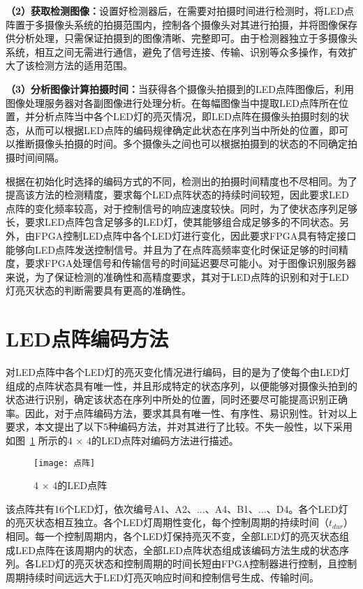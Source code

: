 \textbf{（2）获取检测图像：}设置好检测器后，在需要对拍摄时间进行检测时，将LED点阵置于多摄像头系统的拍摄范围内，控制各个摄像头对其进行拍摄，并将图像保存供分析处理，只需保证拍摄到的图像清晰、完整即可。由于检测器独立于多摄像头系统，相互之间无需进行通信，避免了信号连接、传输、识别等众多操作，有效扩大了该检测方法的适用范围。

\textbf{（3）分析图像计算拍摄时间：}当获得各个摄像头拍摄到的LED点阵图像后，利用图像处理服务器对各副图像进行处理分析。在每幅图像当中提取LED点阵所在位置，并分析点阵当中各个LED灯的亮灭情况，即LED点阵在摄像头拍摄时刻的状态，从而可以根据LED点阵的编码规律确定此状态在序列当中所处的位置，即可以推断摄像头拍摄的时间。多个摄像头之间也可以根据拍摄到的状态的不同确定拍摄时间间隔。

根据在初始化时选择的编码方式的不同，检测出的拍摄时间精度也不尽相同。为了提高该方法的检测精度，要求每个LED点阵状态的持续时间较短，因此要求LED点阵的变化频率较高，对于控制信号的响应速度较快。同时，为了使状态序列足够长，要求LED点阵包含足够多的LED灯，使其能够组合成足够多的不同状态。另外，由FPGA控制LED点阵中各个LED灯进行变化，因此要求FPGA具有特定接口能够向LED点阵发送控制信号。并且为了在点阵高频率变化时保证足够的时间精度，要求FPGA处理信号和传输信号的时间延迟要尽可能小。对于图像识别服务器来说，为了保证检测的准确性和高精度要求，其对于LED点阵的识别和对于LED灯亮灭状态的判断需要具有更高的准确性。

\section{LED点阵编码方法}
\label{codeMe}

对LED点阵中各个LED灯的亮灭变化情况进行编码，目的是为了使每个由LED灯组成的点阵状态具有唯一性，并且形成特定的状态序列，以便能够对摄像头拍到的状态进行识别，确定该状态在序列中所处的位置，同时还要尽可能提高识别正确率。因此，对于点阵编码方法，要求其具有唯一性、有序性、易识别性。针对以上要求，本文提出了以下5种编码方法，并对其进行了比较。不失一般性，以下采用如图~\ref{mat} 所示的4 × 4的LED点阵对编码方法进行描述。

\begin{figure}[h] 
  \centering
  \texttt{[image: 点阵]}
  \caption{4 × 4的LED点阵}
  \label{mat}
\end{figure}

该点阵共有16个LED灯，依次编号A1、A2、...、A4、B1、...、D4。各个LED灯的亮灭状态相互独立。各个LED灯周期性变化，每个控制周期的持续时间（$t_{dur}$）相同。每一个控制周期内，各个LED灯保持亮灭不变，全部LED灯的亮灭状态组成LED点阵在该周期内的状态，全部LED点阵状态组成该编码方法生成的状态序列。各LED灯的亮灭状态和控制周期的时间长短由FPGA控制器进行控制，且控制周期持续时间远远大于LED灯亮灭响应时间和控制信号生成、传输时间。

